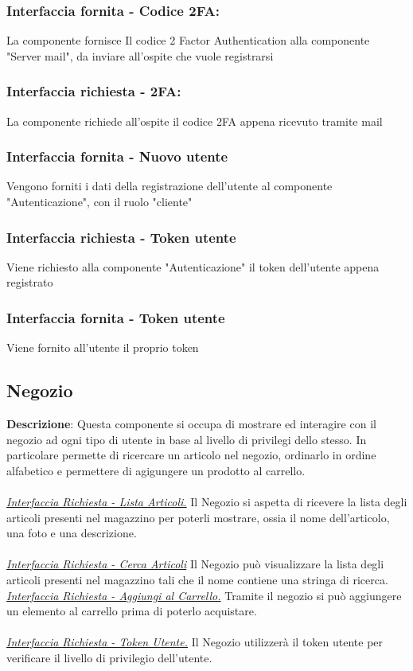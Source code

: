 \documentclass{report}
\begin{document}
\subsubsection{Interfaccia fornita - Codice 2FA: } La componente fornisce Il codice 2 Factor Authentication alla componente "Server mail", da inviare all'ospite che vuole registrarsi
\subsubsection{Interfaccia richiesta - 2FA: } La componente richiede all'ospite il codice 2FA appena ricevuto tramite mail
\subsubsection{Interfaccia fornita - Nuovo utente} Vengono forniti i dati della registrazione dell'utente al componente "Autenticazione", con il ruolo "cliente"
\subsubsection{Interfaccia richiesta - Token utente} Viene richiesto alla componente "Autenticazione" il token dell'utente appena registrato
\subsubsection{Interfaccia fornita - Token utente} Viene fornito all'utente il proprio token

\subsection*{Negozio}

\textbf{Descrizione}: Questa componente si occupa di mostrare  ed interagire con il negozio ad ogni tipo di utente in base al livello di privilegi dello stesso. In particolare permette di ricercare un articolo nel negozio, ordinarlo in ordine alfabetico e permettere di agigungere un prodotto al carrello.
\\
\\
\uline{\textit{Interfaccia Richiesta - Lista Articoli.}} Il Negozio si aspetta di ricevere la lista degli articoli presenti nel magazzino per poterli mostrare, ossia il nome dell'articolo, una foto e una descrizione. \\ \\
\uline{\textit{Interfaccia Richiesta - Cerca Articoli}}
Il Negozio può visualizzare la lista degli articoli presenti nel magazzino tali che il nome contiene una stringa di ricerca.
\uline{\textit{Interfaccia Richiesta - Aggiungi al Carrello.}} Tramite il negozio si può aggiungere un elemento al carrello prima di poterlo acquistare. \\ \\
\uline{\textit{Interfaccia Richiesta - Token Utente.}} Il Negozio utilizzerà il token utente per verificare il livello di privilegio dell'utente.
\end{document}
